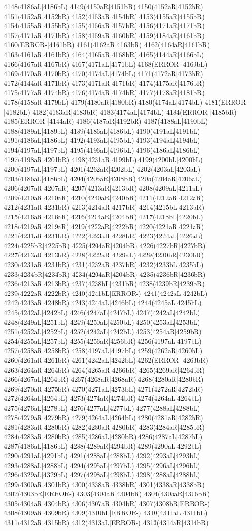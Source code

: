 4148(4186aL|4186bL) 4149(4150aR|4151bR) 4150(4152aR|4152bR) 4151(4152aR|4152bR) 4152(4153aR|4154bR) 4153(4155aR|4155bR) 4154(4155aR|4155bR) 4155(4156aR|4157bR) 4156(4171aR|4171bR) 4157(4171aR|4171bR) 4158(4159aR|4160bR) 4159(4184aR|4161bR) 4160(ERROR-|4161bR) 4161(4162aR|4163bR) 4162(4164aR|4161bR) 4163(4161aR|4161bR) 4164(4165aR|4168bR) 4165(4144aR|4166bL) 4166(4167aR|4167bR) 4167(4171aL|4171bL) 4168(ERROR-|4169bL) 4169(4170aR|4170bR) 4170(4174aL|4174bL) 4171(4172aR|4173bR) 4172(4144aR|4171bR) 4173(4171aR|4171bR) 4174(4175aR|4176bR) 4175(4177aR|4174bR) 4176(4174aR|4174bR) 4177(4178aR|4181bR) 4178(4158aR|4179bL) 4179(4180aR|4180bR) 4180(4174aL|4174bL) 4181(ERROR-|4182bL) 4182(4183aR|4183bR) 4183(4174aL|4174bL) 4184(ERROR-|4185bR) 4185(ERROR-|4144aR) 4186(4187aR|4192bR) 4187(4188aL|4190bL) 4188(4189aL|4189bL) 4189(4186aL|4186bL) 4190(4191aL|4191bL) 4191(4186aL|4186bL) 4192(4193aL|4195bL) 4193(4194aL|4194bL) 4194(4197aL|4197bL) 4195(4196aL|4196bL) 4196(4186aL|4186bL) 4197(4198aR|4201bR) 4198(4231aR|4199bL) 4199(4200bL|4200bL) 4200(4197aL|4197bL) 4201(4262aR|4202bL) 4202(4203aL|4203aL) 4203(4186aL|4186bL) 4204(4205aR|4208bR) 4205(4204aR|4206aL) 4206(4207aR|4207aR) 4207(4213aR|4213bR) 4208(4209aL|4211aL) 4209(4210aR|4210aR) 4210(4240aR|4240bR) 4211(4212aR|4212aR) 4212(4231aR|4231bR) 4213(4214aR|4217bR) 4214(4215bL|4213bR) 4215(4216aR|4216aR) 4216(4204aR|4204bR) 4217(4218bL|4220bL) 4218(4219aR|4219aR) 4219(4222aR|4222bR) 4220(4221aR|4221aR) 4221(4231aR|4231bR) 4222(4223aR|4228bR) 4223(4224aL|4226aL) 4224(4225bR|4225bR) 4225(4204aR|4204bR) 4226(4227bR|4227bR) 4227(4213aR|4213bR) 4228(4222aR|4229aL) 4229(4230bR|4230bR) 4230(4231aR|4231bR) 4231(4232aR|4237bR) 4232(4233bL|4235bL) 4233(4234bR|4234bR) 4234(4204aR|4204bR) 4235(4236bR|4236bR) 4236(4213aR|4213bR) 4237(4238bL|4231bR) 4238(4239bR|4239bR) 4239(4222aR|4222bR) 4240(4241bL|ERROR-) 4241(4242aL|4242bL) 4242(4243aR|4248bR) 4243(4244aL|4246bL) 4244(4245aL|4245bL) 4245(4242aL|4242bL) 4246(4247aL|4247bL) 4247(4242aL|4242bL) 4248(4249aL|4251bL) 4249(4250aL|4250bL) 4250(4253aL|4253bL) 4251(4252aL|4252bL) 4252(4242aL|4242bL) 4253(4254aR|4259bR) 4254(4255aL|4257bL) 4255(4256aR|4256bR) 4256(4197aL|4197bL) 4257(4258aR|4258bR) 4258(4197aL|4197bL) 4259(4262aR|4260bL) 4260(4261aR|4261bR) 4261(4242aL|4242bL) 4262(ERROR-|4263bR) 4263(4264aR|4264bR) 4264(4265aR|4266bR) 4265(4269aR|4264bR) 4266(4267aL|4264bR) 4267(4268aR|4268aR) 4268(4280aR|4280bR) 4269(4270aR|4275bR) 4270(4271aL|4273bL) 4271(4272aR|4272bR) 4272(4264aL|4264bL) 4273(4274aR|4274bR) 4274(4264aL|4264bL) 4275(4276aL|4278bL) 4276(4277aL|4277bL) 4277(4288aL|4288bL) 4278(4279aR|4279bR) 4279(4264aL|4264bL) 4280(4281aR|4282bR) 4281(4283aR|4280bR) 4282(4280aR|4280bR) 4283(4284aR|4285bR) 4284(4283aR|4280bR) 4285(4286aL|4280bR) 4286(4287aL|4287bL) 4287(4186aL|4186bL) 4288(4289aR|4294bR) 4289(4290aL|4292bL) 4290(4291aL|4291bL) 4291(4288aL|4288bL) 4292(4293aL|4293bL) 4293(4288aL|4288bL) 4294(4295aL|4297bL) 4295(4296aL|4296bL) 4296(4329aL|4329bL) 4297(4298aL|4298bL) 4298(4288aL|4288bL) 4299(4300aR|4301bR) 4300(4338aR|4338bR) 4301(4338aR|4338bR) 4302(4303bR|ERROR-) 4303(4304aR|4304bR) 4304(4305aR|4306bR) 4305(4304aR|4304bR) 4306(4307aR|4304bR) 4307(4308bR|ERROR-) 4308(4309aR|4309bR) 4309(4310bL|ERROR-) 4310(4311aL|4311bL) 4311(4312aR|4315bR) 4312(4313aL|ERROR-) 4313(4314aR|4314bR) 
